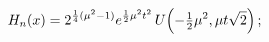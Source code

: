\[\mathop{H_{n}\/}\nolimits\!\left(x\right)=2^{\frac{1}{4}(\mu^{2}-1)}e^{\frac{1%
}{2}\mu^{2}t^{2}}\mathop{U\/}\nolimits\!\left(-\tfrac{1}{2}\mu^{2},\mu t\sqrt{%
2}\right);\]